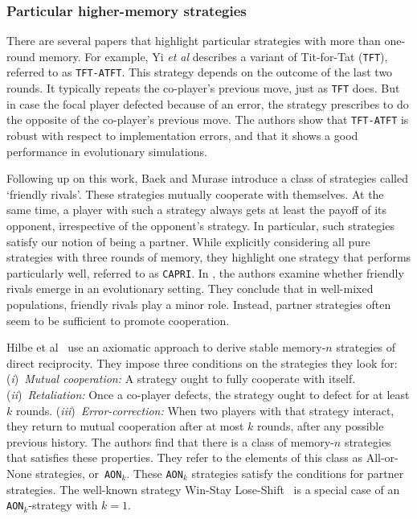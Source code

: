 \documentclass[9pt,twoside,lineno]{pnas-new}
\theoremstyle{plainCl1}
\theoremstyle{plainCl2}
\def\tft{\texttt{TFT}}
\def\tftatft{\texttt{TFT-ATFT}}
\def\capri{\texttt{CAPRI}}
\def\aon{\texttt{AON$_k$}}
\begin{document}
\subsubsection*{Particular higher-memory strategies}
There are several papers that highlight particular strategies with more than one-round memory. 
For example, Yi {\it et al} \cite{Do:JTB:2017} describes a variant of Tit-for-Tat (\tft), referred to as \tftatft. 
This strategy depends on the outcome of the last two rounds. 
It typically repeats the co-player's previous move, just as \tft{} does. 
But in case the focal player defected because of an error, the strategy prescribes to do the opposite of the co-player's previous move.  
The authors show that \tftatft{} is robust with respect to implementation errors, and that it shows a good performance in evolutionary simulations. 

Following up on this work, Baek and Murase \cite{murase:SciRep:2020} introduce a class of strategies called `friendly rivals'. 
These strategies mutually cooperate with themselves. 
At the same time, a player with such a strategy always gets at least the payoff of its opponent, irrespective of the opponent's strategy. 
In particular, such strategies satisfy our notion of being a partner. 
While explicitly considering all pure strategies with three rounds of memory, they highlight one strategy that performs particularly well, referred to as \capri. 
In \cite{Murase:PLoSCompBio:2023a}, the authors examine whether friendly rivals emerge in an evolutionary setting. 
They conclude that in well-mixed populations, friendly rivals play a minor role. 
Instead, partner strategies often seem to be sufficient to promote cooperation.

Hilbe et al~\citep{hilbe:PNAS:2017} use an axiomatic approach to derive stable memory-$n$ strategies of direct reciprocity. 
They impose three conditions on the strategies they look for: 
({\it i})~{\it Mutual cooperation:} A strategy ought to fully cooperate with itself. 
({\it ii})~{\it Retaliation:} Once a co-player defects, the strategy ought to defect for at least $k$ rounds. 
({\it iii})~{\it Error-correction:} When two players with that strategy interact, they return to mutual cooperation after at most $k$ rounds, after any possible previous history. 
The authors find that there is a class of memory-$n$ strategies that satisfies these properties. 
They refer to the elements of this class as All-or-None strategies, or~\aon. 
These \aon{} strategies satisfy the conditions for partner strategies. 
The well-known strategy Win-Stay Lose-Shift~\cite{nowak:Nature:1993} is a special case of an \aon-strategy with $k\!=\!1$. 
\end{document}
